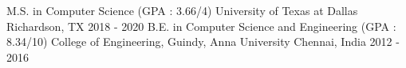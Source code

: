 

\begin{cventries}

  \cventry
    {M.S. in Computer Science  (GPA : 3.66/4)} %
    {University of Texas at Dallas} %
    {Richardson, TX} %
    {2018 - 2020} %
    {
    }
  \cventry
    {B.E. in Computer Science and Engineering  (GPA : 8.34/10)} %
    {College of Engineering, Guindy, Anna University} %
    {Chennai, India} %
    {2012 - 2016} %
    {
    }
\end{cventries}
